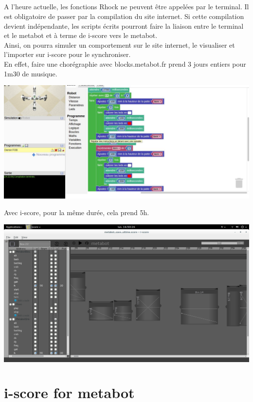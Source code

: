 \documentclass[10pt,a4paper]{report}
\begin{document}
\paragraph{}
A l'heure actuelle, les fonctions Rhock ne peuvent être appelées par le terminal. Il est obligatoire de passer par la compilation du site internet. Si cette compilation devient indépendante, les scripts écrits pourront faire la liaison entre le terminal et le metabot et à terme de i-score vers le metabot.
\\
Ainsi, on pourra simuler un comportement sur le site internet, le visualiser et l'importer sur i-score pour le synchroniser.
\\
En effet, faire une chorégraphie avec blocks.metabot.fr prend 3 jours entiers pour 1m30 de musique. 
\begin{center}
\includegraphics[scale=0.1]{image/site.jpg}
\end{center}
Avec i-score, pour la même durée, cela prend 5h.

\begin{center}
\includegraphics[scale=0.1]{image/danse.png}
\end{center}

\chapter{i-score for metabot}
\end{document}

